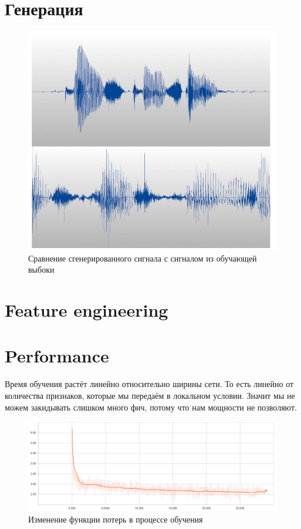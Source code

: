 \documentclass{spbau-diploma}
\begin{document}
\newpage
\section{Генерация}
\begin{figure}[h!]
  \includegraphics[scale=0.6]{img/compare}
  \caption{Сравнение сгенерированного сигнала с сигналом из обучающей выбоки}
  \label{fig:perf}
\end{figure}


\newpage
\section{Feature engineering}


\section{Performance}
Время обучения растёт линейно относительно ширины сети. То есть линейно от количества признаков, которые мы передаём в локальном условии. Значит мы не можем закидывать слишком много фич, потому что нам мощности не позволяют.

\begin{figure}[h!]
  \includegraphics[scale=0.36]{img/perf}
  \caption{Изменение функции потерь в процессе обучения}
  \label{fig:perf}
\end{figure}
\end{document}
